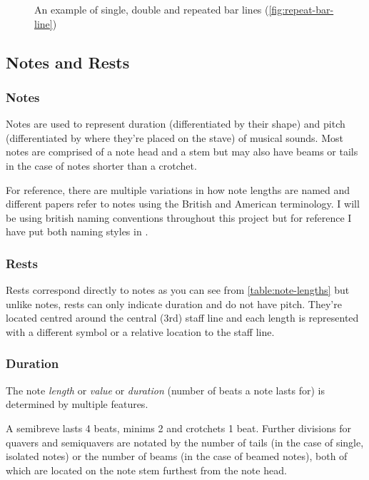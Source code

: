 \begin{figure}[H]
  \caption{An example of single, double and repeated bar lines (\cref{fig:repeat-bar-line})}
  \label{fig:bar-line-types}
\end{figure}

\subsection{Notes and Rests}

\subsubsection{Notes}
\label{sec:music-theory-notes}
Notes are used to represent duration (differentiated by their shape) and pitch (differentiated by where they're placed on the stave) of musical sounds. Most notes are comprised of a note head and a stem but may also have beams or tails in the case of notes shorter than a crotchet.

For reference, there are multiple variations in how note lengths are named and different papers refer to notes using the British and American terminology. I will be using british naming conventions throughout this project but for reference I have put both naming styles in .

\subsubsection{Rests}
\label{sec:music-theory-rests}

Rests correspond directly to notes as you can see from \cref{table:note-lengths} but unlike notes, rests can only indicate duration and do not have pitch. They're located centred around the central (3rd) staff line and each length is represented with a different symbol or a relative location to the staff line.

\subsubsection{Duration}
\label{sec:music-theory-duration}

The note \emph{length} or \emph{value} or \emph{duration} (number of beats a note lasts for) is determined by multiple features.

A semibreve lasts 4 beats, minims 2 and crotchets 1 beat. Further divisions for quavers and semiquavers are notated by the number of tails (in the case of single, isolated notes) or the number of beams (in the case of beamed notes), both of which are located on the note stem furthest from the note head.

